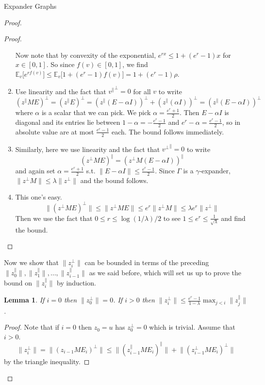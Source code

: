\documentclass{article}
\newcommand{\E}{\mathbb E}
\newtheorem{lemma}{Lemma}
\begin{document}
\begin{section}{Expander Graphs}
\begin{proof}
\begin{proof}
\begin{enumerate}
	  Now note that by convexity of the exponential, $e^{rx} \leq 1 + (e^r - 1)x$ for $x \in [0,1]$.
	  So since $f(v) \in [0,1]$, we find $\E_v\big[e^{rf(v)}\big] \leq \E_v\big[1 + (e^r-1)f(v)\big] = 1 + (e^r-1)\rho$.
	\item
	  Use linearity and the fact that ${v^\parallel}^\perp = 0$ for all $v$ to write $$(z^\parallel M E)^\perp = (z^\parallel E)^\perp = (z^\parallel(E - \alpha I))^\perp + (z^\parallel(\alpha I))^\perp = (z^\parallel(E - \alpha I))^\perp$$ where $\alpha$ is a scalar that we can pick.
	  We pick $\alpha = \frac{e^r + 1}{2}$.
	  Then $E - \alpha I$ is diagonal and its entries lie between $1-\alpha = -\frac{e^r - 1}{2}$ and $e^r - \alpha = \frac{e^r - 1}{2}$, so in absolute value are at most $\frac{e^r-1}{2}$ each.
	  The bound follows immediately.
	 \item
	   Similarly, here we use linearity and the fact that ${v^\perp}^\parallel = 0$ to write
	   $$
	   (z^\perp ME)^\parallel = (z^\perp M(E-\alpha I))^\parallel
	   $$
	   and again set $\alpha = \frac{e^r+1}{2}$ s.t. $\lVert E - \alpha I\rVert \leq \frac{e^r-1}{2}$.
	   Since $\Gamma$ is a $\gamma$-expander, $\lVert z^\perp M\rVert \leq \lambda \lVert z^\perp \rVert$ and the bound follows.
	 \item
	   This one's easy.
	   $$
	   \lVert (z^\perp ME)^\perp\rVert \leq \lVert z^\perp ME\rVert \leq e^r \lVert z^\perp M \rVert \leq \lambda e^r \lVert z^\perp \rVert
	   $$
	   Then we use the fact that $0 \leq r \leq \log(1/\lambda)/2$ to see $1 \leq e^r \leq \frac{1}{\sqrt \lambda}$ and find the bound.
      \end{enumerate}
    \end{proof}
      Now we show that $\lVert z_i^\perp \rVert$ can be bounded in terms of the preceding $\lVert z_0^\parallel \rVert, \lVert z_1^\parallel \rVert, \ldots, \lVert z_{i-1}^\parallel \rVert$ as we said before, which will set us up to prove the bound on $\lVert z_i^\parallel \rVert$ by induction.
    \begin{lemma}
      If $i = 0$ then $\lVert z_0^\perp \rVert = 0$. If $i > 0$ then $\lVert z_i^\perp \rVert \leq \frac{e^r-1}{1-\lambda} \max_{j < i}\lVert z_j^\parallel \rVert$.
    \end{lemma}
    \begin{proof}
      Note that if $i = 0$ then $z_0 = u$ has $z_0^\perp = 0$ which is trivial.
      Assume that $i > 0$.
      $$
      \lVert z_i^\perp\rVert = \lVert (z_{i-1} ME_i)^\perp \rVert \leq \lVert (z_{i-1}^\parallel ME_i)^\parallel \rVert + \lVert (z_{i-1}^\perp ME_i)^\perp \rVert
      $$
      by the triangle inequality.


\end{proof}
\end{proof}
\end{section}
\end{document}
